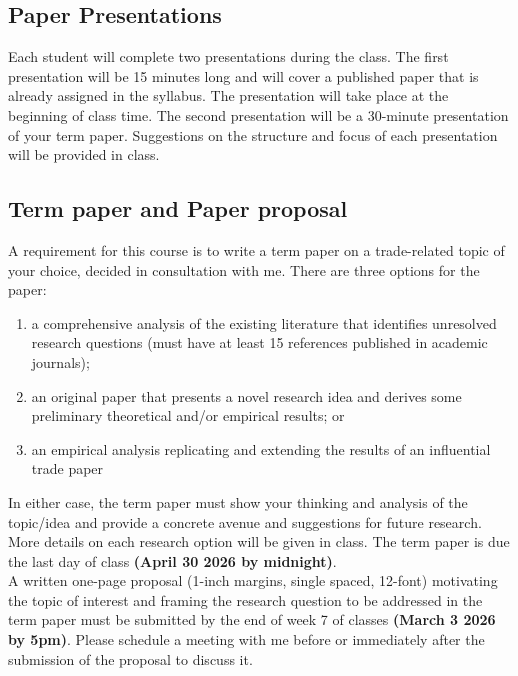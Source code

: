 \documentclass[10pt]{article}
\begin{document}
\subsection*{Paper Presentations}
Each student will complete two presentations during the class. The first presentation will be 15 minutes long and will cover a published paper that is already assigned in the syllabus. 
The presentation will take place at the beginning of class time. 
The second presentation will be a 30-minute presentation of your term paper. Suggestions on the structure and focus of each presentation will be provided in class.

\subsection*{Term paper and Paper proposal}
A requirement for this course is to write a term paper on a trade-related topic of your choice, decided in
consultation with me. There are three options for the paper:
\begin{enumerate}
  \item a comprehensive analysis of the existing literature that identifies unresolved research questions (must have at least 15 references published in academic journals);
  \item an original paper that presents a novel research idea and derives some preliminary theoretical and/or empirical results; or
  \item an empirical analysis replicating and extending the results of an influential trade paper
\end{enumerate}
  
In either case, the term paper must show your thinking and analysis of the topic/idea and provide a concrete avenue and suggestions for future research. 
More details on each research option will be given in class. The term paper is due the last day of class {\bf (April 30 2026 by midnight)}.\\

A written one-page proposal (1-inch margins, single spaced, 12-font) motivating the topic of interest and framing the research question to be addressed in the term paper must be submitted by the end of week 7
of classes {\bf (March 3 2026 by 5pm)}. Please schedule a meeting with me before or immediately after the submission of the proposal to discuss it.
\end{document}
